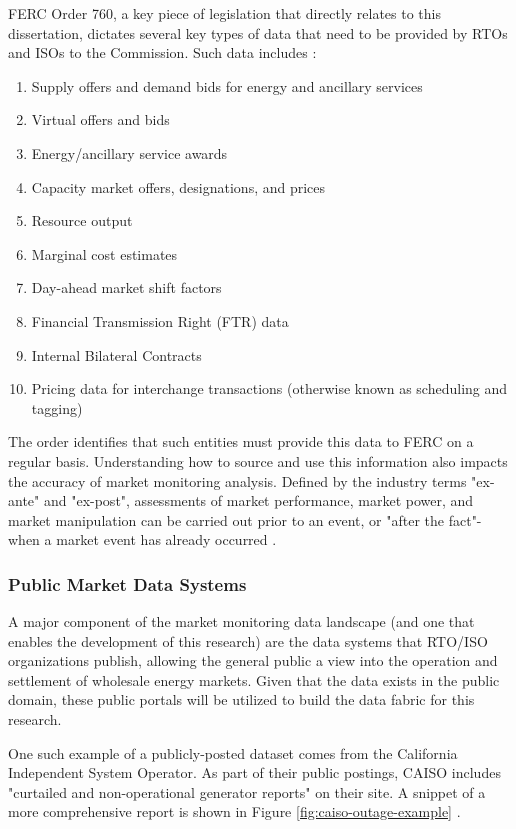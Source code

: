 FERC Order 760, a key piece of legislation that directly relates to this dissertation, dictates several key types of data that need to be provided by RTOs and ISOs to the Commission. Such data includes \cite{daignault}: 

\begin{enumerate}
    \item{Supply offers and demand bids for energy and ancillary services}
    \item{Virtual offers and bids}
    \item{Energy/ancillary service awards}
    \item{Capacity market offers, designations, and prices}
    \item{Resource output}
    \item{Marginal cost estimates}
    \item{Day-ahead market shift factors}
    \item{Financial Transmission Right (FTR) data}
    \item{Internal Bilateral Contracts}
    \item{Pricing data for interchange transactions (otherwise known as scheduling and tagging)}
\end{enumerate}

The order identifies that such entities must provide this data to FERC on a regular basis. Understanding how to source and use this information also impacts the accuracy of market monitoring analysis. Defined by the industry terms "ex-ante" and "ex-post", assessments of market performance, market power, and market manipulation can be carried out prior to an event, or "after the fact"- when a market event has already occurred \cite{green-neuhoff-newberry}.

\subsubsection{Public Market Data Systems}

A major component of the market monitoring data landscape (and one that enables the development of this research) are the data systems that RTO/ISO organizations publish, allowing the general public a view into the operation and settlement of wholesale energy markets. Given that the data exists in the public domain, these public portals will be utilized to build the data fabric for this research.

One such example of a publicly-posted dataset comes from the California Independent System Operator. As part of their public postings, CAISO includes "curtailed and non-operational generator reports" on their site. A snippet of a more comprehensive report is shown in Figure \ref{fig:caiso-outage-example} \cite{caiso-public-data-example}.

